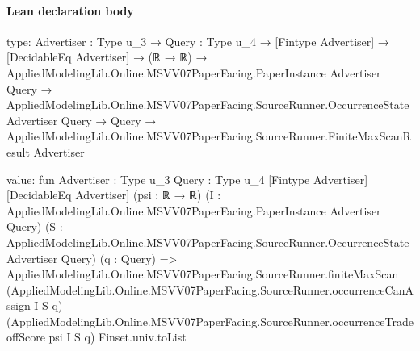 \documentclass[10pt]{article}
\begin{document}
\paragraph{Lean declaration body}
\begin{ReviewVerbatim}
type:
{Advertiser : Type u_3} →
  {Query : Type u_4} →
    [Fintype Advertiser] →
      [DecidableEq Advertiser] →
        (ℝ → ℝ) →
          AppliedModelingLib.Online.MSVV07PaperFacing.PaperInstance Advertiser Query →
            AppliedModelingLib.Online.MSVV07PaperFacing.SourceRunner.OccurrenceState Advertiser Query →
              Query → AppliedModelingLib.Online.MSVV07PaperFacing.SourceRunner.FiniteMaxScanResult Advertiser

value:
fun {Advertiser : Type u_3} {Query : Type u_4} [Fintype Advertiser] [DecidableEq Advertiser] (psi : ℝ → ℝ)
    (I : AppliedModelingLib.Online.MSVV07PaperFacing.PaperInstance Advertiser Query)
    (S : AppliedModelingLib.Online.MSVV07PaperFacing.SourceRunner.OccurrenceState Advertiser Query) (q : Query) =>
  AppliedModelingLib.Online.MSVV07PaperFacing.SourceRunner.finiteMaxScan
    (AppliedModelingLib.Online.MSVV07PaperFacing.SourceRunner.occurrenceCanAssign I S q)
    (AppliedModelingLib.Online.MSVV07PaperFacing.SourceRunner.occurrenceTradeoffScore psi I S q) Finset.univ.toList
\end{ReviewVerbatim}
\end{document}
